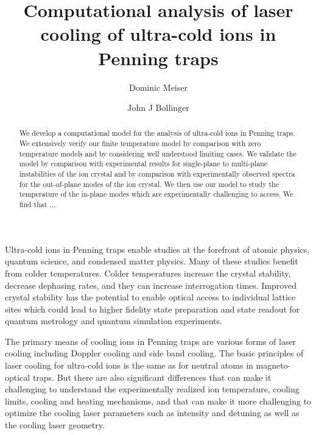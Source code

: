 \documentclass[aps, pra, preprint]{revtex4-1}
\begin{document}
\title{Computational analysis of laser cooling of ultra-cold ions
  in Penning traps
}

\author{Dominic Meiser}
\author{John J Bollinger}

\begin{abstract}
  We develop a computational model for the analysis of ultra-cold
  ions in Penning traps. We extensively verify our finite
  temperature model by comparison with zero temperature models
  and by considering well understood limiting cases. We validate
  the model by comparison with experimental results for
  single-plane to multi-plane instabilities of the ion crystal
  and by comparison with experimentally observed spectra for the
  out-of-plane modes of the ion crystal.
  We then use our model to study the temperature of the in-plane
  modes which are experimentally challenging to access. We find
  that ...
\end{abstract}

\maketitle


Ultra-cold ions in Penning traps enable studies at the forefront
of atomic physics, quantum
science, and condensed matter
physics. Many of these studies benefit from
colder temperatures. Colder temperatures increase the crystal
stability, decrease dephasing rates, and they can increase
interrogation times. Improved crystal stability has the potential
to enable optical access to individual lattice sites which could
lead to higher fidelity state preparation and state readout for quantum
metrology and quantum simulation
experiments.

The primary means of cooling ions in Penning traps are various
forms of laser cooling including Doppler cooling and side band
cooling. The basic principles of laser cooling for ultra-cold
ions is the same as for neutral atoms in magneto-optical traps.
But there are also significant differences that can make it
challenging to understand the experimentally realized ion
temperature, cooling limits, cooling and heating mechanisms, and
that can make it more challenging to optimize the cooling laser
parameters such as intensity and detuning as well as the cooling
laser geometry.
\end{document}
